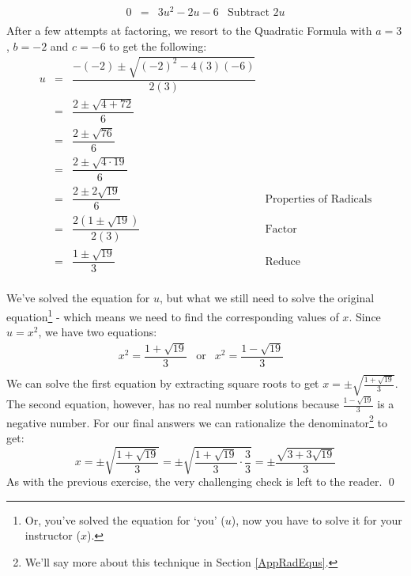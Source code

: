 \documentclass{ximera}
\begin{document}
\begin{example}
\begin{enumerate}
\[\begin{array}{rclr}
0 & = & 3u^2 - 2u - 6 & \text{Subtract $2u$} \\

\end{array}\] After a few attempts at factoring, we resort to the Quadratic Formula with $a = 3$, $b = -2$ and $c = -6$ to get the following:\[ \begin{array}{rclr}

u & = & \dfrac{-(-2) \pm \sqrt{(-2)^2 - 4(3)(-6)}}{2(3)} & \\ [10pt]

& = & \dfrac{2 \pm \sqrt{4 + 72}}{6} & \\ [10pt]

& = & \dfrac{2 \pm \sqrt{76}}{6} & \\ [10pt]

& = & \dfrac{2 \pm \sqrt{4 \cdot 19}}{6} & \\ [10pt]

& = & \dfrac{2 \pm 2\sqrt{19}}{6} & \text{Properties of Radicals} \\ [10pt]

& = & \dfrac{2(1 \pm \sqrt{19})}{2(3)} & \text{Factor} \\ [10pt]

& = & \dfrac{1 \pm \sqrt{19}}{3} & \text{Reduce} \\

\end{array} \]

We've solved the equation for $u$, but what we still need to solve the original equation\footnote{Or, you've solved the equation for `you' ($u$), now you have to solve it for your instructor ($x$).} - which means we need to find the corresponding values of $x$.  Since $u = x^2$, we have two equations:\[ \begin{array}{rclr}  

x^2  =\dfrac{1 + \sqrt{19}}{3} & \text{or} & x^2  =\dfrac{1 - \sqrt{19}}{3} & \\

\end{array}\] We can solve the first equation by extracting square roots to get  $x = \pm \sqrt{\frac{1 + \sqrt{19}}{3}}$.  The second equation, however, has no real number solutions because $\frac{1 - \sqrt{19}}{3}$ is a negative number.  For our final answers we can rationalize the denominator\footnote{We'll say more about this technique in Section \ref{AppRadEqus}.} to get: \[ x = \pm \sqrt{\dfrac{1 + \sqrt{19}}{3}} = \pm \sqrt{\dfrac{1 + \sqrt{19}}{3} \cdot \dfrac{3}{3}} = \pm \dfrac{\sqrt{3 + 3\sqrt{19}}}{3} \] As with the previous exercise, the very challenging check is left to the reader. \qed

\end{enumerate}

\end{example}
\end{document}
